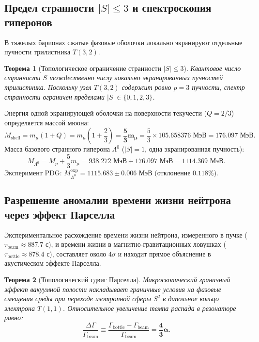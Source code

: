 \documentclass[11pt,a4paper]{article}
\newtheorem{theorem}{Теорема}[section]
\theoremstyle{definition}
\theoremstyle{remark}
\begin{document}
\subsection{Предел странности $|S| \le 3$ и спектроскопия гиперонов}
В тяжелых барионах сжатые фазовые оболочки локально экранируют отдельные пучности трилистника $T(3,2)$.

\begin{theorem}[Топологическое ограничение странности $|S| \le 3$]
Квантовое число странности $S$ тождественно числу локально экранированных пучностей трилистника. Поскольку узел $T(3,2)$ содержит ровно $p=3$ пучности, спектр странности ограничен пределами $|S| \in \{0, 1, 2, 3\}$.
\end{theorem}

Энергия одной экранирующей оболочки на поверхности текучести ($Q = 2/3$) определяется массой мюона:
\begin{equation}
    M_{\mathrm{shell}} = m_\mu (1 + Q) = m_\mu \left( 1 + \frac{2}{3} \right) = \boldsymbol{\frac{5}{3} m_\mu} = \frac{5}{3} \times 105.658376\text{ МэВ} = \mathbf{176.097\text{ МэВ}}.
    \label{eq:strangeness_shell}
\end{equation}
Масса базового странного гиперона $\Lambda^0$ ($|S|=1$, одна экранированная пучность):
\begin{equation}
    M_{\Lambda^0} = M_p + \frac{5}{3} m_\mu = 938.272\text{ МэВ} + 176.097\text{ МэВ} = \mathbf{1114.369\text{ МэВ}}.
\end{equation}
Эксперимент PDG: $M_{\Lambda^0}^{\mathrm{exp}} = 1115.683 \pm 0.006$ МэВ (отклонение $0.118\%$).

\subsection{Разрешение аномалии времени жизни нейтрона через эффект Парселла}
Экспериментальное расхождение времени жизни нейтрона, измеренного в пучке ($\tau_{\mathrm{beam}} \approx 887.7$ с), и времени жизни в магнитно-гравитационных ловушках ($\tau_{\mathrm{bottle}} \approx 878.4$ с), составляет около $4\sigma$ и находит прямое объяснение в акустическом эффекте Парселла.

\begin{theorem}[Топологический сдвиг Парселла]
Макроскопический граничный эффект вакуумной полости накладывает граничные условия на фазовые смещения среды при переходе изотропной сферы $S^2$ в дипольное кольцо электрона $T(1,1)$. Относительное увеличение темпа распада в резонаторе равно:
\begin{equation}
    \frac{\Delta \Gamma}{\Gamma_{\mathrm{beam}}} \equiv \frac{\Gamma_{\mathrm{bottle}} - \Gamma_{\mathrm{beam}}}{\Gamma_{\mathrm{beam}}} = \boldsymbol{\frac{4}{3}\alpha}.
    \label{eq:purcell_shift}
\end{equation}
\end{theorem}
\end{document}

